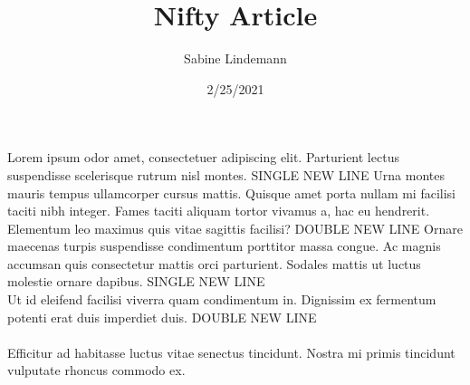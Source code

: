 \documentclass[a4paper]{article}
\title{Nifty Article}
\author{Sabine Lindemann}
\date{2/25/2021}
\begin{document}
\maketitle
Lorem ipsum odor amet, consectetuer adipiscing elit. Parturient lectus suspendisse scelerisque rutrum nisl montes. SINGLE NEW LINE \newline Urna montes mauris tempus ullamcorper cursus mattis. Quisque amet porta nullam mi facilisi taciti nibh integer. Fames taciti aliquam tortor vivamus a, hac eu hendrerit. Elementum leo maximus quis vitae sagittis facilisi? DOUBLE NEW LINE \newline \newline Ornare maecenas turpis suspendisse condimentum porttitor massa congue. Ac magnis accumsan quis consectetur mattis orci parturient. Sodales mattis ut luctus molestie ornare dapibus. SINGLE NEW LINE\\Ut id eleifend facilisi viverra quam condimentum in. Dignissim ex fermentum potenti erat duis imperdiet duis. DOUBLE NEW LINE\\\\Efficitur ad habitasse luctus vitae senectus tincidunt. Nostra mi primis tincidunt vulputate rhoncus commodo ex.
\end{document}
